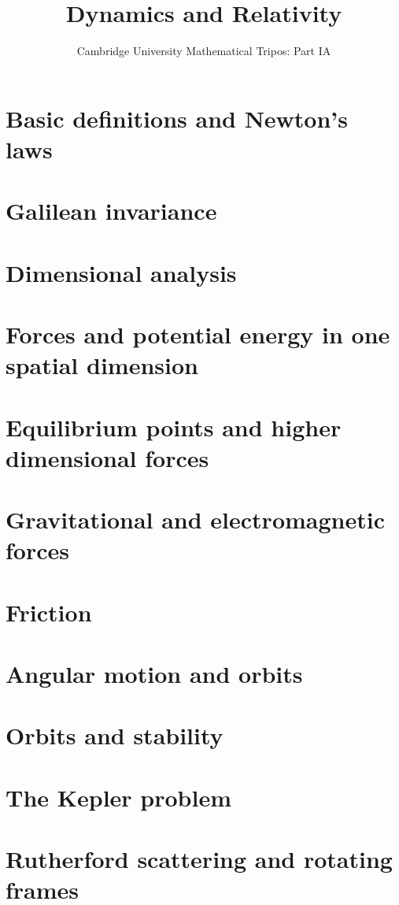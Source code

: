 \documentclass{article}
\title{Dynamics and Relativity}
\author{Cambridge University Mathematical Tripos: Part IA}
\begin{document}
\maketitle

\tableofcontentsnewpage{}

\section{Basic definitions and Newton's laws}

\section{Galilean invariance}

\section{Dimensional analysis}

\section{Forces and potential energy in one spatial dimension}

\section{Equilibrium points and higher dimensional forces}

\section{Gravitational and electromagnetic forces}

\section{Friction}

\section{Angular motion and orbits}

\section{Orbits and stability}

\section{The Kepler problem}

\section{Rutherford scattering and rotating frames}

\end{document}
